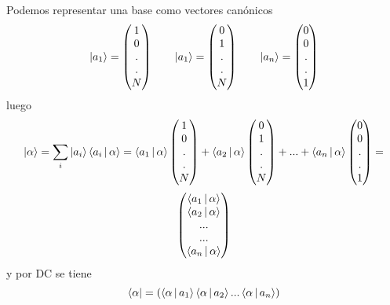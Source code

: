 \documentclass[10pt,oneside]{CBFT_book}
\begin{document}
Podemos representar una base como vectores canónicos
\[
	\Ket{a_1} = \begin{pmatrix}
			1 \\
			0 \\
			. \\
			. \\
			N
			\end{pmatrix} \qquad 
	\Ket{a_1} = \begin{pmatrix}
			0 \\
			1 \\
			. \\
			. \\
			N
			\end{pmatrix} \qquad 
	\Ket{a_n} = \begin{pmatrix}
			0 \\
			0 \\
			. \\
			. \\
			1
			\end{pmatrix}
\]
luego 
\[
	\Ket{\alpha} = \sum_i \Ket{a_i}\Braket{a_i|\alpha} =
		\Braket{a_1|\alpha} \begin{pmatrix}
			1 \\
			0 \\
			. \\
			. \\
			N
			\end{pmatrix} +
		\Braket{a_2|\alpha} \begin{pmatrix}
			0 \\
			1 \\
			. \\
			. \\
			N
			\end{pmatrix} +
			... +
		\Braket{a_n|\alpha} \begin{pmatrix}
			0 \\
			0 \\
			. \\
			. \\
			1
			\end{pmatrix} =
\]
\[
	\begin{pmatrix}
		\Braket{a_1|\alpha} \\
		\Braket{a_2|\alpha} \\
			... \\
			... \\
		\Braket{a_n|\alpha}
	\end{pmatrix}
\]
y por DC se tiene 
\[
	\Bra{\alpha} = ( \Braket{\alpha|a_1} \Braket{\alpha|a_2} ... \Braket{\alpha|a_n} )
\]
\end{document}

